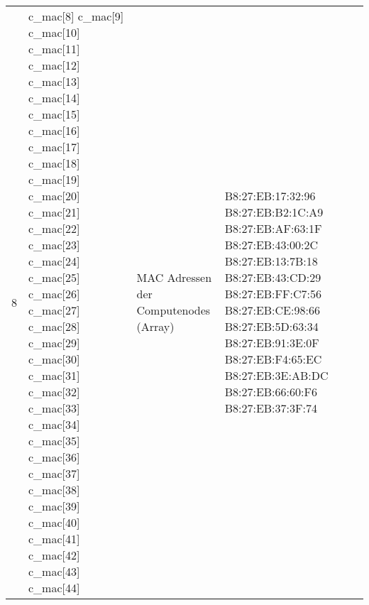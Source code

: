 \begin{longtable}{| p{0.5cm} | p{3cm} | p{8.5cm} | p{4cm} |}
8 & c\_mac[8] \newline c\_mac[9] \newline  c\_mac[10] \newline c\_mac[11] \newline c\_mac[12] \newline c\_mac[13] \newline c\_mac[14] \newline c\_mac[15] \newline c\_mac[16] \newline c\_mac[17] \newline c\_mac[18] \newline c\_mac[19] \newline c\_mac[20] \newline c\_mac[21] \newline c\_mac[22] \newline c\_mac[23] \newline c\_mac[24] \newline c\_mac[25] \newline c\_mac[26] \newline c\_mac[27] \newline c\_mac[28] \newline c\_mac[29] \newline c\_mac[30] \newline c\_mac[31] \newline c\_mac[32] \newline c\_mac[33] \newline c\_mac[34] \newline c\_mac[35] \newline c\_mac[36] \newline c\_mac[37] \newline c\_mac[38] \newline c\_mac[39] \newline c\_mac[40] \newline c\_mac[41] \newline c\_mac[42] \newline c\_mac[43] \newline c\_mac[44] & MAC Adressen der Computenodes (Array) & B8:27:EB:17:32:96 \newline B8:27:EB:B2:1C:A9 \newline B8:27:EB:AF:63:1F \newline B8:27:EB:43:00:2C \newline B8:27:EB:13:7B:18 \newline B8:27:EB:43:CD:29 \newline B8:27:EB:FF:C7:56 \newline B8:27:EB:CE:98:66 \newline B8:27:EB:5D:63:34 \newline B8:27:EB:91:3E:0F \newline B8:27:EB:F4:65:EC \newline B8:27:EB:3E:AB:DC \newline B8:27:EB:66:60:F6 \newline B8:27:EB:37:3F:74 \newline 
\end{longtable}
